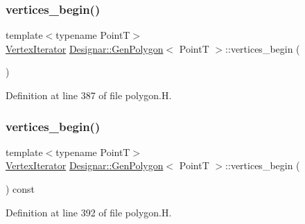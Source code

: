\subsubsection{\texorpdfstring{vertices\+\_\+begin()}{vertices\_begin()}\hspace{0.1cm}{\footnotesize\ttfamily [1/2]}}
{\footnotesize\ttfamily template$<$typename PointT$>$ \\
\hyperlink{class_designar_1_1_gen_polygon_1_1_vertex_iterator}{Vertex\+Iterator} \hyperlink{class_designar_1_1_gen_polygon}{Designar\+::\+Gen\+Polygon}$<$ PointT $>$\+::vertices\+\_\+begin (\begin{DoxyParamCaption}{ }\end{DoxyParamCaption})\hspace{0.3cm}{\ttfamily [inline]}}



Definition at line 387 of file polygon.\+H.

\mbox{\label{class_designar_1_1_gen_polygon_a1a2dd20f7312fcba7649263f77e9f649}} 
\subsubsection{\texorpdfstring{vertices\+\_\+begin()}{vertices\_begin()}\hspace{0.1cm}{\footnotesize\ttfamily [2/2]}}
{\footnotesize\ttfamily template$<$typename PointT$>$ \\
\hyperlink{class_designar_1_1_gen_polygon_1_1_vertex_iterator}{Vertex\+Iterator} \hyperlink{class_designar_1_1_gen_polygon}{Designar\+::\+Gen\+Polygon}$<$ PointT $>$\+::vertices\+\_\+begin (\begin{DoxyParamCaption}{ }\end{DoxyParamCaption}) const\hspace{0.3cm}{\ttfamily [inline]}}



Definition at line 392 of file polygon.\+H.

\mbox{\label{class_designar_1_1_gen_polygon_aad1c6e27b6288072e2821c65512ba2a4}} 
